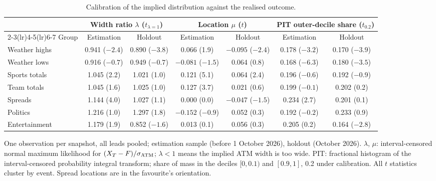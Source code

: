 \begin{table}[t]
\centering\small
\setlength{\tabcolsep}{4pt}
\begin{threeparttable}
\caption{Calibration of the implied distribution against the realised outcome.}\label{tab:lad-calib}
\begin{tabular}{@{}lcccccc@{}}
\toprule
 & \multicolumn{2}{c}{Width ratio $\lambda$ ($t_{\lambda=1}$)} & \multicolumn{2}{c}{Location $\mu$ ($t$)} & \multicolumn{2}{c}{PIT outer-decile share ($t_{0.2}$)} \\
\cmidrule(lr){2-3}\cmidrule(lr){4-5}\cmidrule(lr){6-7}
Group & Estimation & Holdout & Estimation & Holdout & Estimation & Holdout \\
\midrule
Weather highs & 0.941 ($-2.4$) & 0.890 ($-3.8$) & 0.066 (1.9) & $-0.095$ ($-2.4$) & 0.178 ($-3.2$) & 0.170 ($-3.9$) \\
Weather lows  & 0.916 ($-0.7$) & 0.949 ($-0.7$) & $-0.081$ ($-1.5$) & 0.064 (0.8) & 0.168 ($-6.3$) & 0.180 ($-3.5$) \\
Sports totals & 1.045 (2.2) & 1.021 (1.0) & 0.121 (5.1) & 0.064 (2.4) & 0.196 ($-0.6$) & 0.192 ($-0.9$) \\
Team totals   & 1.045 (1.6) & 1.025 (1.0) & 0.127 (3.7) & 0.021 (0.6) & 0.199 ($-0.1$) & 0.202 (0.2) \\
Spreads       & 1.144 (4.0) & 1.027 (1.1) & 0.000 (0.0) & $-0.047$ ($-1.5$) & 0.234 (2.7) & 0.201 (0.1) \\
Politics      & 1.216 (1.0) & 1.297 (1.8) & $-0.152$ ($-0.9$) & 0.052 (0.3) & 0.192 ($-0.2$) & 0.233 (0.9) \\
Entertainment & 1.179 (1.9) & 0.852 ($-1.6$) & 0.013 (0.1) & 0.056 (0.3) & 0.205 (0.2) & 0.164 ($-2.8$) \\
\bottomrule
\end{tabular}
\begin{tablenotes}[flushleft]\footnotesize
\item One observation per snapshot, all leads pooled; estimation sample (before 1 October 2026),
holdout (October 2026). $\lambda$, $\mu$: interval-censored normal maximum likelihood for
$(X_T-F)/\sigma_{\mathrm{ATM}}$; $\lambda<1$ means the implied ATM width is too wide. PIT: fractional
histogram of the interval-censored probability integral transform; share of mass in the deciles
$[0,0.1)$ and $[0.9,1]$, 0.2 under calibration. All $t$ statistics cluster by event. Spread
locations are in the favourite's orientation.
\end{tablenotes}
\end{threeparttable}
\end{table}

